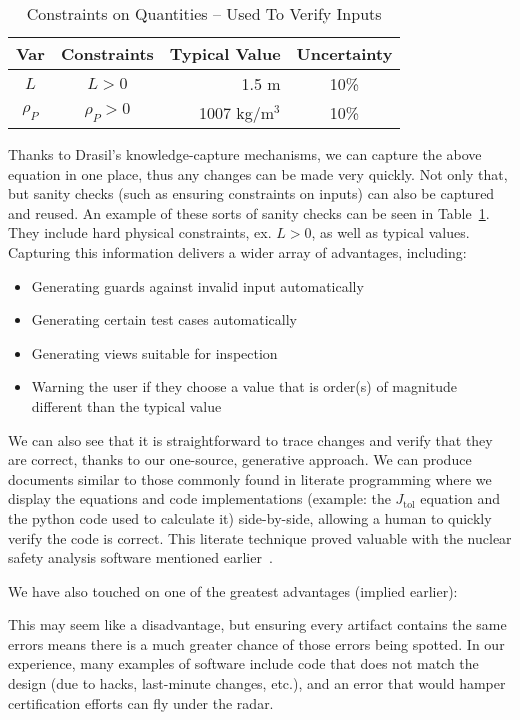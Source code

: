 \documentclass[sigconf]{acmart}
\newcommand{\jtol}{$J_{\mbox{tol}}$}
\begin{document}
{\begin{table} 
\centering
\caption{Constraints on Quantities -- Used To Verify Inputs}
\begin{tabular}{c c r c } 
\toprule
\textbf{Var} & \textbf{Constraints} & \textbf{Typical Value} & \textbf{Uncertainty}\\ \midrule
$L$ & $L > 0$ & 1.5 m & 10\% \\ 
$\rho_P$ & $\rho_P > 0$    & 1007 kg/m$^3$    & 10\% \\
\bottomrule
\end{tabular}
\label{tab:pcm}
\end{table}

Thanks to Drasil's knowledge-capture mechanisms, we can capture the above 
equation in one place, thus any changes can be made very quickly. Not only 
that, but sanity checks (such as ensuring constraints on inputs) can also be 
captured and reused. An example of these sorts of sanity checks can be seen in 
Table~\ref{tab:pcm}. They include hard physical constraints, ex. $L > 0$, as 
well as typical values. Capturing this information
delivers a wider array of advantages, including:

\begin{itemize}
\item Generating guards against invalid input automatically
\item Generating certain test cases automatically
\item Generating views suitable for inspection
\item Warning the user if they choose a value that is order(s) of magnitude
  different than the typical value
\end{itemize}
We can also see that it is straightforward to trace changes and verify that they 
are correct, thanks to our one-source, generative approach. We can produce 
documents similar to those commonly found in literate programming where we 
display the equations and code implementations (example: the \jtol{} equation 
and the python code used to calculate it) side-by-side, allowing a human to 
quickly verify the code is correct.  This literate technique proved valuable with
the nuclear safety analysis software mentioned
earlier~\cite{SmithAndKoothoor2016}.

We have also touched on one of the greatest advantages (implied 
earlier): 

This 
may seem like a disadvantage, but ensuring every artifact contains the same 
errors means there is a much greater chance of those errors being spotted. In 
our experience, many examples of software include code that does not match the 
design (due to hacks, last-minute changes, etc.), and an error that would 
hamper certification efforts can fly under the radar. 

}
\end{document}
